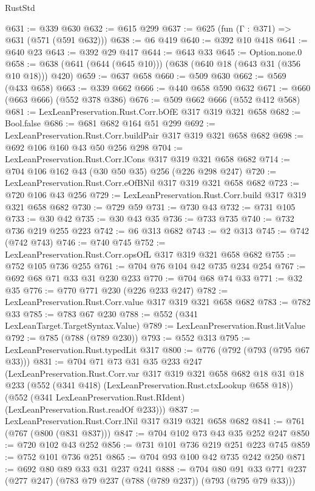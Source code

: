 \begin{lexlean}{RustStd}
\begin{coremodule}
@631 := @339 @630
@632 := @615 @299
@637 := @625 (fun (Γ : @371) => @631 (@571 (@591 @632)))
@638 := @6 @419
@640 := @392 @10 @418
@641 := @640 @23
@643 := @392 @29 @417
@644 := @643 @33
@645 := Option.none.{0}
@658 := @638 (@641 (@644 (@645 @10))) (@638 (@640 @18 (@643 @31 (@356 @10 @18))) @420)
@659 := @637 @658
@660 := @509 @630
@662 := @569 (@433 @658)
@663 := @339 @662
@666 := @440 @658 @590 @632
@671 := @660 (@663 @666) (@552 @378 @386)
@676 := @509 @662 @666 (@552 @412 @568)
@681 := LexLeanPreservation.Rust.Corr.bOfE @317 @319 @321 @658
@682 := Bool.false
@686 := @681 @682 @164 @51 @299
@692 := LexLeanPreservation.Rust.Corr.buildPair @317 @319 @321 @658 @682
@698 := @692 @106 @160 @43 @50 @256 @298
@704 := LexLeanPreservation.Rust.Corr.lCons @317 @319 @321 @658 @682
@714 := @704 @106 @162 @43 (@30 @50 @35) @256 (@226 @298 @247)
@720 := LexLeanPreservation.Rust.Corr.eOfBNil @317 @319 @321 @658 @682
@723 := @720 @106 @43 @256
@729 := LexLeanPreservation.Rust.Corr.build @317 @319 @321 @658 @682
@730 := @729 @59
@731 := @730 @43
@732 := @731 @105
@733 := @30 @42
@735 := @30 @43 @35
@736 := @733 @735
@740 := @732 @736 @219 @255 @223
@742 := @6 @313 @682
@743 := @2 @313
@745 := @742 (@742 @743)
@746 := @740 @745
@752 := LexLeanPreservation.Rust.Corr.opsOfL @317 @319 @321 @658 @682
@755 := @752 @105 @736 @255
@761 := @704 @76 @104 @42 @735 @234 @254
@767 := @692 @68 @71 @33 @31 @230 @233
@770 := @704 @68 @74 @33
@771 := @32 @35
@776 := @770 @771 @230 (@226 @233 @247)
@782 := LexLeanPreservation.Rust.Corr.value @317 @319 @321 @658 @682
@783 := @782 @33
@785 := @783 @67 @230
@788 := @552 (@341 LexLeanTarget.TargetSyntax.Value)
@789 := LexLeanPreservation.Rust.litValue
@792 := @785 (@788 (@789 @230))
@793 := @552 @313
@795 := LexLeanPreservation.Rust.typedLit @317
@800 := @776 (@792 (@793 (@795 @67 @33)))
@831 := @704
    @71
    @73
    @31
    @35
    @233
    @247
    (LexLeanPreservation.Rust.Corr.var
      @317
      @319
      @321
      @658
      @682
      @18
      @31
      @18
      @233
      (@552 (@341 @418) (LexLeanPreservation.Rust.ctxLookup @658 @18))
      (@552 (@341 LexLeanPreservation.Rust.RIdent) (LexLeanPreservation.Rust.readOf @233)))
@837 := LexLeanPreservation.Rust.Corr.lNil @317 @319 @321 @658 @682
@841 := @761 (@767 (@800 (@831 @837)))
@847 := @704 @102 @73 @43 @35 @252 @247
@850 := @720 @102 @43 @252
@856 := @731 @101 @736 @219 @251 @223 @745
@859 := @752 @101 @736 @251
@865 := @704 @93 @100 @42 @735 @242 @250
@871 := @692 @80 @89 @33 @31 @237 @241
@888 := @704
    @80
    @91
    @33
    @771
    @237
    (@277 @247)
    (@783 @79 @237 (@788 (@789 @237)) (@793 (@795 @79 @33)))

\end{coremodule}
\end{lexlean}
